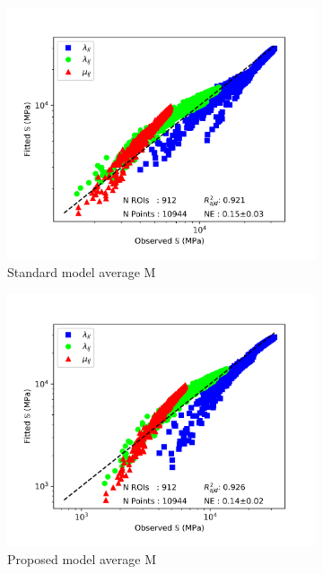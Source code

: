 \documentclass[a4paper,fleqn]{DC_ArtStyle}
\begin{document}
\begin{figure}[!h]
\begin{subfigure}[b]{0.45\linewidth}
			\includegraphics[width=\linewidth]{RegressionFabric_Transverse_Mave}
			\caption{Standard model average M}
		\end{subfigure}
		\begin{subfigure}[b]{0.45\linewidth}
			\includegraphics[width=\linewidth]{RegressionFabricK_Transverse_Mave}
			\caption{Proposed model average M}
		\end{subfigure}
		\begin{subfigure}[b]{0.45\linewidth}

\end{subfigure}
\end{figure}
\end{document}
